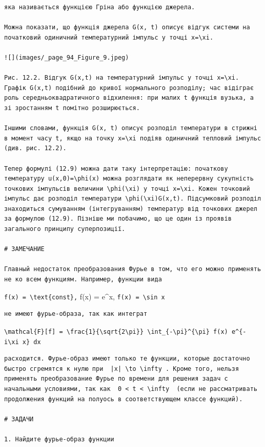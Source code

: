 \documentclass[
  ukrainian,
]{article}
\begin{document}
\begin{verbatim}
яка називається функцією Гріна або функцією джерела.

Можна показати, що функція джерела G(x, t) описує відгук системи на початковий одиничний температурний імпульс у точці x=\xi.

![](images/_page_94_Figure_9.jpeg)

Рис. 12.2. Відгук G(x,t) на температурний імпульс у точці x=\xi. Графік G(x,t) подібний до кривої нормального розподілу; час відіграє роль середньоквадратичного відхилення: при малих t функція вузька, а зі зростанням t помітно розширюється.

Іншими словами, функція G(x, t) описує розподіл температури в стрижні в момент часу t, якщо на точку x=\xi подіяв одиничний тепловий імпульс (див. рис. 12.2).

Тепер формулі (12.9) можна дати таку інтерпретацію: початкову температуру u(x,0)=\phi(x) можна розглядати як неперервну сукупність точкових імпульсів величини \phi(\xi) у точці x=\xi. Кожен точковий імпульс дає розподіл температури \phi(\xi)G(x,t). Підсумковий розподіл знаходиться сумуванням (інтегруванням) температур від точкових джерел за формулою (12.9). Пізніше ми побачимо, що це один із проявів загального принципу суперпозиції.

# ЗАМЕЧАНИЕ

Главный недостаток преобразования Фурье в том, что его можно применять не ко всем функциям. Например, функции вида
\end{verbatim}

\texttt{f(x)\ =\ \textbackslash{}text\{const\},} f(x) = e\^{}x,
\texttt{f(x)\ =\ \textbackslash{}sin\ x}

\begin{verbatim}
не имеют фурье-образа, так как интеграт
\end{verbatim}

\texttt{\textbackslash{}mathcal\{F\}{[}f{]}\ =\ \textbackslash{}frac\{1\}\{\textbackslash{}sqrt\{2\textbackslash{}pi\}\}\ \textbackslash{}int\_\{-\textbackslash{}pi\}\^{}\{\textbackslash{}pi\}\ f(x)\ e\^{}\{-i\textbackslash{}xi\ x\}\ dx}

\begin{verbatim}
расходится. Фурье-образ имеют только те функции, которые достаточно быстро сгремятся к нулю при  |x| \to \infty . Кроме того, нельзя применять преобразование Фурье по времени для решения задач с начальными условиями, так как  0 < t < \infty  (если не рассматривать продолжения функций на полуось в соответствующем классе функций).

# ЗАДАЧИ

1. Найдите фурье-образ функции
\end{verbatim}
\end{document}
